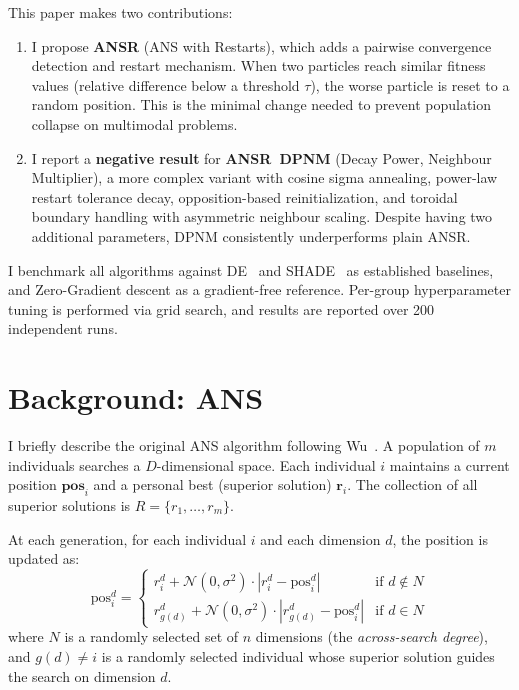 \documentclass[11pt,a4paper]{article}
\begin{document}
This paper makes two contributions:
\begin{enumerate}
    \item I propose \textbf{ANSR} (ANS with Restarts), which adds a pairwise convergence detection and restart mechanism. When two particles reach similar fitness values (relative difference below a threshold $\tau$), the worse particle is reset to a random position. This is the minimal change needed to prevent population collapse on multimodal problems.
    \item I report a \textbf{negative result} for \textbf{ANSR~DPNM} (Decay Power, Neighbour Multiplier), a more complex variant with cosine sigma annealing, power-law restart tolerance decay, opposition-based reinitialization, and toroidal boundary handling with asymmetric neighbour scaling. Despite having two additional parameters, DPNM consistently underperforms plain ANSR.
\end{enumerate}

I benchmark all algorithms against DE~\cite{storn1997de} and SHADE~\cite{tanabe2013shade} as established baselines, and Zero-Gradient descent as a gradient-free reference. Per-group hyperparameter tuning is performed via grid search, and results are reported over 200 independent runs.

\section{Background: ANS}

I briefly describe the original ANS algorithm following Wu~\cite{wu2015ans}. A population of $m$ individuals searches a $D$-dimensional space. Each individual $i$ maintains a current position $\mathbf{pos}_i$ and a personal best (superior solution) $\mathbf{r}_i$. The collection of all superior solutions is $R = \{r_1, \ldots, r_m\}$.

At each generation, for each individual $i$ and each dimension $d$, the position is updated as:
\begin{equation}
    \text{pos}_i^d = \begin{cases}
        r_i^d + \mathcal{N}(0, \sigma^2) \cdot |r_i^d - \text{pos}_i^d| & \text{if } d \notin N \\
        r_{g(d)}^d + \mathcal{N}(0, \sigma^2) \cdot |r_{g(d)}^d - \text{pos}_i^d| & \text{if } d \in N
    \end{cases}
    \label{eq:ans_update}
\end{equation}
where $N$ is a randomly selected set of $n$ dimensions (the \emph{across-search degree}), and $g(d) \neq i$ is a randomly selected individual whose superior solution guides the search on dimension $d$.
\end{document}
